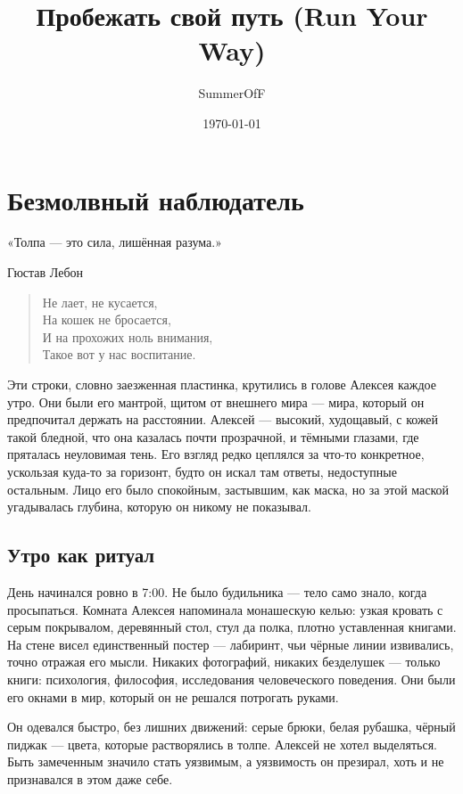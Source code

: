 \documentclass[12pt,a4paper]{book}
\title{Пробежать свой путь (Run Your Way)}
\author{SummerOfF}
\date{\today}
\begin{document}
\maketitle

\tableofcontents

\chapter{Безмолвный наблюдатель}
\epigraph{«Толпа --- это сила, лишённая разума.»}{Гюстав Лебон}
\begin{verse}
Не лает, не кусается,\\
На кошек не бросается,\\
И на прохожих ноль внимания,\\
Такое вот у нас воспитание.
\end{verse}

Эти строки, словно заезженная пластинка, крутились в голове Алексея каждое утро. Они были его мантрой, щитом от внешнего мира --- мира, который он предпочитал держать на расстоянии. Алексей --- высокий, худощавый, с кожей такой бледной, что она казалась почти прозрачной, и тёмными глазами, где пряталась неуловимая тень. Его взгляд редко цеплялся за что-то конкретное, ускользая куда-то за горизонт, будто он искал там ответы, недоступные остальным. Лицо его было спокойным, застывшим, как маска, но за этой маской угадывалась глубина, которую он никому не показывал.

\section{Утро как ритуал}

День начинался ровно в 7:00. Не было будильника --- тело само знало, когда просыпаться. Комната Алексея напоминала монашескую келью: узкая кровать с серым покрывалом, деревянный стол, стул да полка, плотно уставленная книгами. На стене висел единственный постер --- лабиринт, чьи чёрные линии извивались, точно отражая его мысли. Никаких фотографий, никаких безделушек --- только книги: психология, философия, исследования человеческого поведения. Они были его окнами в мир, который он не решался потрогать руками.

Он одевался быстро, без лишних движений: серые брюки, белая рубашка, чёрный пиджак --- цвета, которые растворялись в толпе. Алексей не хотел выделяться. Быть замеченным значило стать уязвимым, а уязвимость он презирал, хоть и не признавался в этом даже себе.
\end{document}
